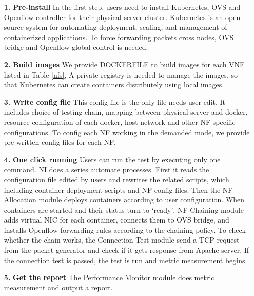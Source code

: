 \documentclass{sig-alternate-10pt}
\begin{document}
\begin{itemize}
\item[\textbf{1.}]{}\textbf{Pre-install} 
In the first step, users need to install Kubernetes, OVS 
and Openflow controller for their physical server cluster. 
Kubernetes is an open-source system for automating deployment, scaling, 
and management of containerized applications. 
To force forwarding packets cross nodes, 
OVS bridge and Openflow global control is needed. 

\item[\textbf{2.}]{}\textbf{Build images} 
We provide DOCKERFILE to build images for each VNF listed in Table \ref{nfs}, 
A private registry is needed to manage the images, 
so that Kubernetes can create containers distributely using local images.

\item[\textbf{3.}]{}\textbf{Write config file} 
This config file is the only file needs user edit. 
It includes choice of testing chain, 
mapping between physical server and docker,
resource configuration of each docker, 
host network and other NF specific configurations. 
To config each NF working in the demanded mode, 
we provide pre-written config files for each NF. 

\item[\textbf{4.}]{}\textbf{One click running} 
Users can run the test by executing only one command. 
NI does a series automate processes. 
First it reads the configuration file edited by users and rewrites the related scripts, 
which including container deployment scripts and NF config files. 
Then the NF Allocation module deploys containers according to user configuration. 
When containers are started and their status turn to `ready', 
NF Chaining module adds virtual NIC for each container, 
connects them to OVS bridge, 
and installs Openflow forwarding rules according to the chaining policy. 
To check whether the chain works, 
the Connection Test module send a TCP request 
from the packet generator and check if it gets response from Apache server. 
If the connection test is passed, 
the test is run and metric measurement begins.

\item[\textbf{5.}]{}\textbf{Get the report} 
The Performance Monitor module does metric measurement 
and output a report.

\end{itemize}

\end{document}
